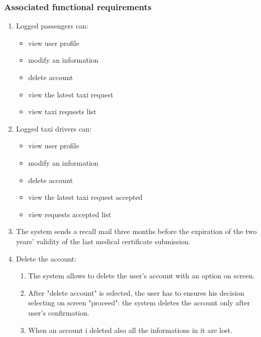 \subsubsection{Associated functional requirements}
\begin{enumerate}

\item Logged passengers can:
\begin{itemize}
\item view user profile
\item modify an information
\item delete account
\item view the latest taxi request
\item view taxi requests list
\end{itemize}

\item Logged taxi drivers can:
\begin{itemize}
\item view user profile
\item modify an information
\item delete account
\item view the latest taxi request accepted
\item view requests accepted list
\end{itemize}

\item The system sends a recall mail three months before the expiration of the two years' validity of the last medical certificate submission.

\item Delete the account: 
\begin{enumerate}
\item The system allows to delete the user's account with an option on screen.
\item After "delete account" is selected, the user has to ensures his decision selecting on screen "proceed": the system deletes the account only after user's confirmation.
\item When an account i deleted also all the informations in it are lost.
\end{enumerate}


\end{enumerate}
